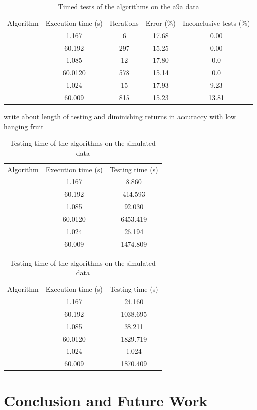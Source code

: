 \begin{table}[htbp]
\centering
\begin{tabular}{|c|c|c|c|c|}
\hline
Algorithm & Execution time (s) & Iterations & Error (\%) & Inconclusive tests (\%)  \\ \hhline{|=|=|=|=|=|}
\multirow{ 2}{*}{\adaB} & 1.167 & 6 & 17.68 & 0.00  \\\cline{2-5}
& 60.192 & 297 &  15.25 & 0.00  \\ \Xhline{1pt}
\multirow{ 2}{*}{\NHB} & 1.085 & 12 & 17.80  & 0.0 \\\cline{2-5}
& 60.0120 & 578 &  15.14 & 0.0  \\ \Xhline{1pt}
\multirow{ 2}{*}{\squintB} & 1.024 & 15 & 17.93  & 9.23\\\cline{2-5}
 & 60.009 & 815 &  15.23  &  13.81\\ \hline
\end{tabular}
\caption{Timed tests of the algorithms on the a9a data}
\label{tbl:SVMTime}
\end{table}
{\huge\color{red}write about length of testing and diminishing returns in accuraccy with low hanging fruit}
\begin{table}[htbp]
\centering
\begin{tabular}{|c|c|c|}
\hline
Algorithm & Execution time (s) & Testing time (s)  \\ \hhline{|=|=|=|}
\multirow{ 2}{*}{\adaB} & 1.167 & 8.860 \\\cline{2-3}
& 60.192 & 414.593  \\ \Xhline{1pt}
\multirow{ 2}{*}{\NHB} & 1.085 & 92.030 \\\cline{2-3}
& 60.0120 & 6453.419  \\ \Xhline{1pt}
\multirow{ 2}{*}{\squintB} & 1.024 & 26.194\\\cline{2-3}
 & 60.009 & 1474.809\\ \hline
\end{tabular}
\caption{Testing time of the algorithms on the simulated data}
\label{tbl:GDTestingTime}
\end{table}

\begin{table}[htbp]
\centering
\begin{tabular}{|c|c|c|}
\hline
Algorithm & Execution time (s) & Testing time (s)  \\ \hhline{|=|=|=|}
\multirow{ 2}{*}{\adaB} & 1.167 & 24.160 \\\cline{2-3}
& 60.192 & 1038.695  \\ \Xhline{1pt}
\multirow{ 2}{*}{\NHB} & 1.085 & 38.211 \\\cline{2-3}
& 60.0120 & 1829.719  \\ \Xhline{1pt}
\multirow{ 2}{*}{\squintB} & 1.024 & 1.024\\\cline{2-3}
 & 60.009 & 1870.409\\ \hline
\end{tabular}
\caption{Testing time of the algorithms on the simulated data}
\label{tbl:SVMTestingTime}
\end{table}
\FloatBarrier
 \section{Conclusion and Future Work}
 \label{sec:Concl}